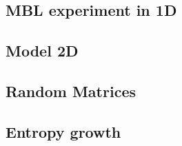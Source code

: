 




\subsection{MBL experiment in 1D}


% 




\subsection{Model 2D}






\subsection{Random Matrices}







\subsection{Entropy growth}







% 









% 





\newpage

\newpage



% 

% 


